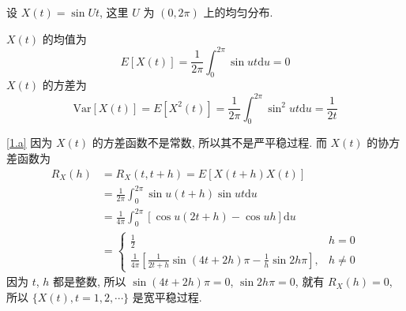 \documentclass[boxes]{homework}
\begin{document}
\begin{problem}
设 $X(t) = \sin Ut$, 这里 $U$ 为 $(0, 2\pi)$ 上的均匀分布.
\begin{parts}[a]
    \part \label{1.a} 若 $t = 1, 2, \cdots$, 证明 $\{X(t), t = 1, 2, \cdots\}$ 是宽平稳但不是严平稳过程,
    \part \label{1.b} 设 $t\in [0, \infty)$, 证明 $\{X(t), t \geq 0\}$ 既不是宽平稳也不是严平稳过程.
\end{parts}
\end{problem}
\begin{solution}
    $X(t)$ 的均值为
    \begin{equation}
        E[X(t)] = \frac{1}{2\pi}\int_0^{2\pi}\sin ut\mathrm{d}u = 0
    \end{equation}
    $X(t)$ 的方差为
    \begin{equation}
        \mathrm{Var}[X(t)] = E[X^2(t)] = \frac{1}{2\pi}\int_0^{2\pi}\sin^2 ut\mathrm{d}u = \frac{1}{2t}
    \end{equation}

    \ref{1.a} 因为 $X(t)$ 的方差函数不是常数, 所以其不是严平稳过程. 而 $X(t)$ 的协方差函数为
    \begin{equation} \label{eq:1.3}
        \begin{aligned}
            R_X(h) & = R_X(t, t+h) = E[X(t+h)X(t)]                                                                                                           \\
                   & = \frac{1}{2\pi}\int_0^{2\pi} \sin u(t + h) \sin ut\mathrm{d} u                                                                         \\
                   & = \frac{1}{4\pi}\int_0^{2\pi} [\cos u(2t+h) - \cos uh]\mathrm{d} u                                                                      \\
                   & = \begin{cases}
                           \frac{1}{2}                                                                                      & h = 0   \\
                           \displaystyle\frac{1}{4\pi}\left[\frac{1}{2t + h}\sin (4t+2h)\pi - \frac{1}{h}\sin 2h\pi\right], & h\neq 0
                       \end{cases}
        \end{aligned}
    \end{equation}
    因为 $t$, $h$ 都是整数, 所以 $\sin (4t+2h)\pi = 0$, $\sin 2h\pi = 0$, 就有 $R_X(h) = 0$, 所以
    $\{X(t), t = 1, 2, \cdots\}$ 是宽平稳过程.


\end{solution}
\end{document}

